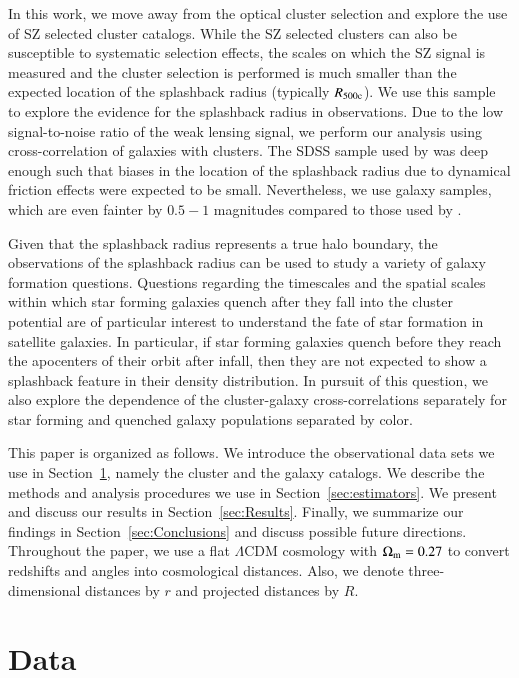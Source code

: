 \documentclass[iop, apjl, twocolappendix, numberedappendix]{emulateapj}
\begin{document}
In this work, we move away from the optical cluster selection and
explore the use of SZ selected cluster catalogs. While the SZ
selected clusters can also be susceptible to systematic selection
effects, the scales on which the SZ signal is measured and the
cluster selection is performed is much smaller than the expected
location of the splashback radius (typically $R_{\rm 500c}$). We use
this sample to explore the evidence for the splashback radius in
observations.  Due to the low signal-to-noise ratio of the weak
lensing signal, we perform our analysis using cross-correlation of
galaxies with clusters.  The SDSS sample used by
\citet{more2016detection} was deep enough such that biases in the
location of the splashback radius due to dynamical friction effects
were expected to be small.  Nevertheless, we use galaxy samples, which
are even fainter by $0.5-1$ magnitudes compared to those used by
\citet{more2016detection}.

Given that the splashback radius represents a true halo boundary,
the observations of the splashback radius can be used to study a
variety of galaxy formation questions. Questions regarding the
timescales and the spatial scales within which star forming galaxies
quench after they fall into the cluster potential are of particular
interest to understand the fate of star formation in satellite
galaxies. In particular, if star forming galaxies quench before they
reach the apocenters of their orbit after infall, then they are not
expected to show a splashback feature in their density distribution.
In pursuit of this question, we also explore the dependence of the
cluster-galaxy cross-correlations separately for star forming and
quenched galaxy populations separated by color.

This paper is organized as follows. We introduce the observational
data sets we use in Section~\ref{sec:data}, namely the cluster and the
galaxy catalogs. We describe the methods and analysis procedures we
use in Section~\ref{sec:estimators}. We present and discuss our
results in Section~\ref{sec:Results}. Finally, we summarize our
findings in Section~\ref{sec:Conclusions} and discuss possible future
directions. Throughout the paper, we use a flat $\Lambda$CDM cosmology
with $\Omega_{\rm m}=0.27$ to convert redshifts and angles into
cosmological distances. Also, we denote three-dimensional distances by
$r$ and projected distances by $R$.


\section{Data}
\label{sec:data}
\end{document}
